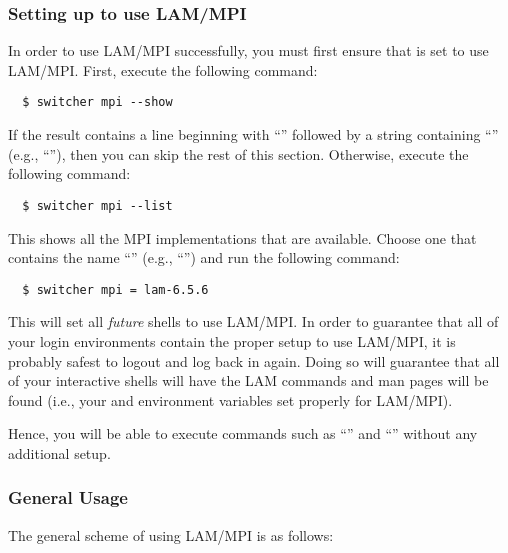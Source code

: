 \subsubsection{Setting up  to use LAM/MPI}

In order to use LAM/MPI successfully, you must first ensure that
 is set to use LAM/MPI.  First, execute the following
command:

\begin{verbatim}
  $ switcher mpi --show
\end{verbatim}
  
If the result contains a line beginning with ``''
followed by a string containing ``'' (e.g.,
``''), then you can skip the rest of this section.
Otherwise, execute the following command:

\begin{verbatim}
  $ switcher mpi --list
\end{verbatim}

This shows all the MPI implementations that are available.  Choose one
that contains the name ``'' (e.g., ``'') and
run the following command:

\begin{verbatim}
  $ switcher mpi = lam-6.5.6
\end{verbatim}

This will set all {\em future} shells to use LAM/MPI.  In order to
guarantee that all of your login environments contain the proper setup
to use LAM/MPI, it is probably safest to logout and log back in again.
Doing so will guarantee that all of your interactive shells will have
the LAM commands and man pages will be found (i.e., your 
and  environment variables set properly for LAM/MPI).

Hence, you will be able to execute commands such as ``''
and ``'' without any additional setup.

\subsubsection{General Usage}

The general scheme of using LAM/MPI is as follows:

